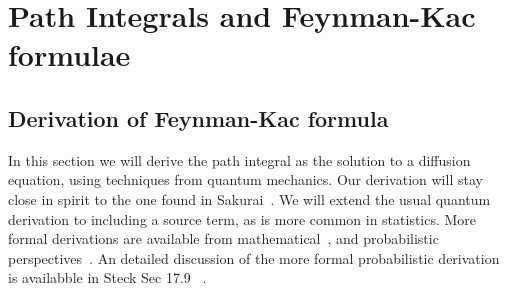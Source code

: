 \chapter{Path Integrals and Feynman-Kac formulae}

\label{ch:feynman_kac}


\section{Derivation of Feynman-Kac formula }

In this section we will derive the path integral as the solution to a diffusion equation,
using techniques from quantum mechanics.  Our derivation will stay close in spirit to the 
one found in Sakurai~\cite{Sakurai1994}.  We will extend the usual quantum derivation to
including a source term, as is more common in statistics.   More formal derivations are available from mathematical~\cite{Cartier2004},
and probabilistic perspectives~\cite{Karatzas1991, Durrett1996}.  
An detailed discussion of the more formal probabilistic derivation is availabble in Steck Sec 17.9~\cite{SteckNotes} .

